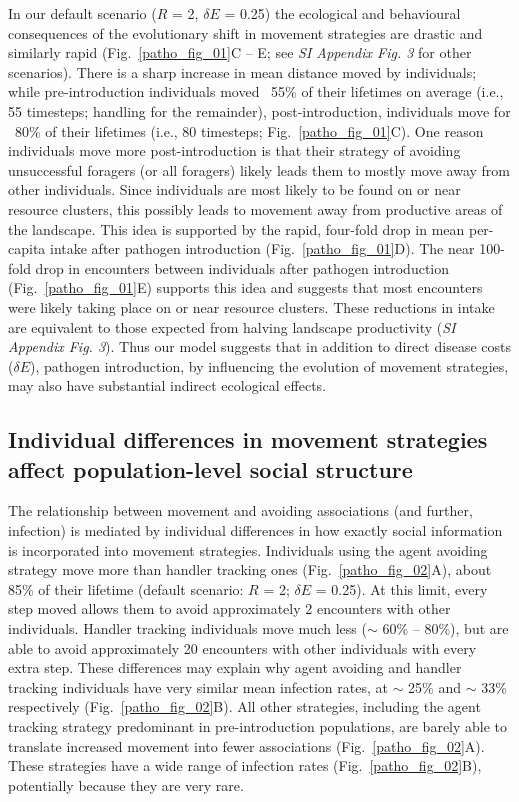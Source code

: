 In our default scenario ($R$ = 2, $\delta E$ = 0.25) the ecological and behavioural consequences of the evolutionary shift in movement strategies are drastic and similarly rapid (Fig.~\ref{patho_fig_01}C -- E; see \textit{SI Appendix Fig. 3} for other scenarios).
There is a sharp increase in mean distance moved by individuals; while pre-introduction individuals moved ~55\% of their lifetimes on average (i.e., 55 timesteps; handling for the remainder), post-introduction, individuals move for ~80\% of their lifetimes (i.e., 80 timesteps; Fig.~\ref{patho_fig_01}C).
One reason individuals move more post-introduction is that their strategy of avoiding unsuccessful foragers (or all foragers) likely leads them to mostly move away from other individuals.
Since individuals are most likely to be found on or near resource clusters, this possibly leads to movement away from productive areas of the landscape.
This idea is supported by the rapid, four-fold drop in mean per-capita intake after pathogen introduction (Fig.~\ref{patho_fig_01}D).
The near 100-fold drop in encounters between individuals after pathogen introduction (Fig.~\ref{patho_fig_01}E) supports this idea and suggests that most encounters were likely taking place on or near resource clusters.
These reductions in intake are equivalent to those expected from halving landscape productivity (\textit{SI Appendix Fig. 3}).
Thus our model suggests that in addition to direct disease costs ($\delta E$), pathogen introduction, by influencing the evolution of movement strategies, may also have substantial indirect ecological effects.

\subsection*{Individual differences in movement strategies affect population-level social structure}

The relationship between movement and avoiding associations (and further, infection) is mediated by individual differences in how exactly social information is incorporated into movement strategies.
Individuals using the agent avoiding strategy move more than handler tracking ones (Fig.~\ref{patho_fig_02}A), about 85\% of their lifetime (default scenario: $R$ = 2; $\delta E$ = 0.25).
At this limit, every step moved allows them to avoid approximately 2 encounters with other individuals.
Handler tracking individuals move much less ($\sim$ 60\% -- 80\%), but are able to avoid approximately 20 encounters with other individuals with every extra step.
These differences may explain why agent avoiding and handler tracking individuals have very similar mean infection rates, at $\sim$ 25\% and $\sim$ 33\% respectively (Fig.~\ref{patho_fig_02}B).
All other strategies, including the agent tracking strategy predominant in pre-introduction populations, are barely able to translate increased movement into fewer associations (Fig.~\ref{patho_fig_02}A).
These strategies have a wide range of infection rates (Fig.~\ref{patho_fig_02}B), potentially because they are very rare.

